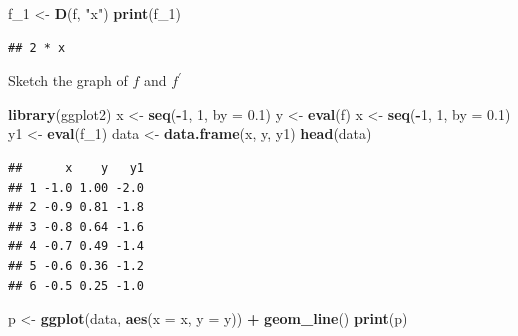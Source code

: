 \documentclass[
]{book}
\newenvironment{Shaded}{\begin{snugshade}}{\end{snugshade}}
\newcommand{\AttributeTok}[1]{\textcolor[rgb]{0.13,0.29,0.53}{#1}}
\newcommand{\DecValTok}[1]{\textcolor[rgb]{0.00,0.00,0.81}{#1}}
\newcommand{\FloatTok}[1]{\textcolor[rgb]{0.00,0.00,0.81}{#1}}
\newcommand{\FunctionTok}[1]{\textcolor[rgb]{0.13,0.29,0.53}{\textbf{#1}}}
\newcommand{\NormalTok}[1]{#1}
\newcommand{\OtherTok}[1]{\textcolor[rgb]{0.56,0.35,0.01}{#1}}
\newcommand{\SpecialCharTok}[1]{\textcolor[rgb]{0.81,0.36,0.00}{\textbf{#1}}}
\newcommand{\StringTok}[1]{\textcolor[rgb]{0.31,0.60,0.02}{#1}}
\begin{document}
\begin{Shaded}
\begin{Highlighting}[]
\NormalTok{f\_1 }\OtherTok{\textless{}{-}} \FunctionTok{D}\NormalTok{(f, }\StringTok{"x"}\NormalTok{)}
\FunctionTok{print}\NormalTok{(f\_1)}
\end{Highlighting}
\end{Shaded}

\begin{verbatim}
## 2 * x
\end{verbatim}

Sketch the graph of \(f\) and \(f^\prime\)

\begin{Shaded}
\begin{Highlighting}[]
\FunctionTok{library}\NormalTok{(ggplot2)}
\NormalTok{x }\OtherTok{\textless{}{-}} \FunctionTok{seq}\NormalTok{(}\SpecialCharTok{{-}}\DecValTok{1}\NormalTok{, }\DecValTok{1}\NormalTok{, }\AttributeTok{by =} \FloatTok{0.1}\NormalTok{)}
\NormalTok{y }\OtherTok{\textless{}{-}} \FunctionTok{eval}\NormalTok{(f)}
\NormalTok{x }\OtherTok{\textless{}{-}} \FunctionTok{seq}\NormalTok{(}\SpecialCharTok{{-}}\DecValTok{1}\NormalTok{, }\DecValTok{1}\NormalTok{, }\AttributeTok{by =} \FloatTok{0.1}\NormalTok{)}
\NormalTok{y1 }\OtherTok{\textless{}{-}} \FunctionTok{eval}\NormalTok{(f\_1)}
\NormalTok{data }\OtherTok{\textless{}{-}} \FunctionTok{data.frame}\NormalTok{(x, y, y1)}
\FunctionTok{head}\NormalTok{(data)}
\end{Highlighting}
\end{Shaded}

\begin{verbatim}
##      x    y   y1
## 1 -1.0 1.00 -2.0
## 2 -0.9 0.81 -1.8
## 3 -0.8 0.64 -1.6
## 4 -0.7 0.49 -1.4
## 5 -0.6 0.36 -1.2
## 6 -0.5 0.25 -1.0
\end{verbatim}

\begin{Shaded}
\begin{Highlighting}[]
\NormalTok{p }\OtherTok{\textless{}{-}} \FunctionTok{ggplot}\NormalTok{(data, }\FunctionTok{aes}\NormalTok{(}\AttributeTok{x =}\NormalTok{ x, }\AttributeTok{y =}\NormalTok{ y)) }\SpecialCharTok{+}
  \FunctionTok{geom\_line}\NormalTok{()}
\FunctionTok{print}\NormalTok{(p)}
\end{Highlighting}
\end{Shaded}
\end{document}
